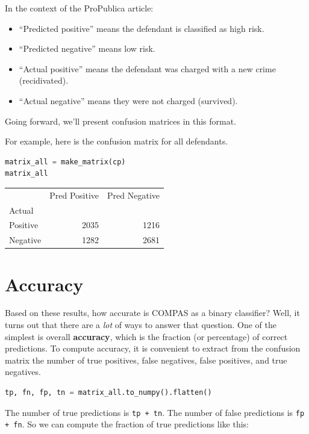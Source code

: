 In the context of the ProPublica article:

\begin{itemize}
\item
  ``Predicted positive'' means the defendant is classified as high risk.
\item
  ``Predicted negative'' means low risk.
\item
  ``Actual positive'' means the defendant was charged with a new crime
  (recidivated).
\item
  ``Actual negative'' means they were not charged (survived).
\end{itemize}

Going forward, we'll present confusion matrices in this format.

For example, here is the confusion matrix for all defendants.

\begin{lstlisting}[language=Python,style=source]
matrix_all = make_matrix(cp)
matrix_all
\end{lstlisting}

\begin{tabular}{lrr}
\midrule
 & Pred Positive & Pred Negative \\
Actual &  &  \\
\midrule
Positive & 2035 & 1216 \\
Negative & 1282 & 2681 \\
\midrule
\end{tabular}

\hypertarget{accuracy}{%
\section{Accuracy}\label{accuracy}}

Based on these results, how accurate is COMPAS as a binary classifier?
Well, it turns out that there are a \emph{lot} of ways to answer that
question. One of the simplest is overall \textbf{accuracy}, which is the
fraction (or percentage) of correct predictions. To compute accuracy, it
is convenient to extract from the confusion matrix the number of true
positives, false negatives, false positives, and true negatives.

\begin{lstlisting}[language=Python,style=source]
tp, fn, fp, tn = matrix_all.to_numpy().flatten()
\end{lstlisting}

The number of true predictions is \passthrough{\lstinline!tp + tn!}. The
number of false predictions is \passthrough{\lstinline!fp + fn!}. So we
can compute the fraction of true predictions like this:

